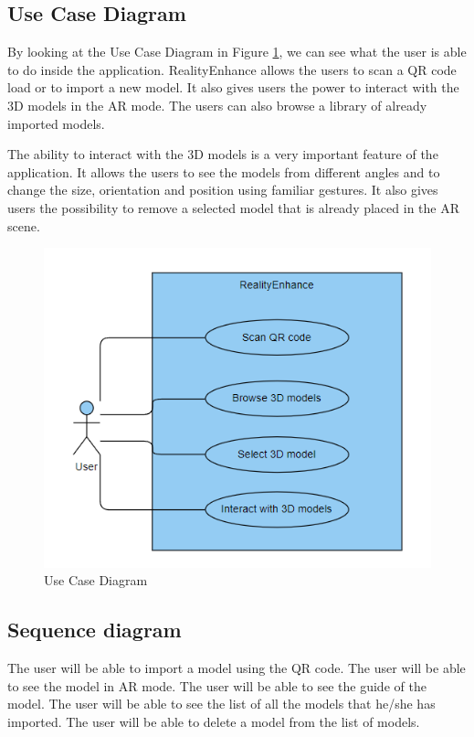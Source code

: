 \subsection*{Use Case Diagram}
By looking at the Use Case Diagram in Figure \ref{fig:UseCaseDiagram}, we can see what the user is able to do inside the application. RealityEnhance allows the users to scan a \ac{QR} code load or to import a new model. It also gives users the power to interact with the \ac{3D} models in the \ac{AR} mode. The users can also browse a library of already imported models.

The ability to interact with the \ac{3D} models is a very important feature of the application. It allows the users to see the models from different angles and to change the size, orientation and position using familiar gestures. It also gives users the possibility to remove a selected model that is already placed in the \ac{AR} scene.
\begin{figure}[ht]
    \centering
    \includegraphics{img/UseCaseDiagram.png}
    \caption{Use Case Diagram}
    \label{fig:UseCaseDiagram}
\end{figure}

\clearpage

\subsection*{Sequence diagram}
The user will be able to import a model using the \ac{QR} code. The user will be able to see the model in \ac{AR} mode. The user will be able to see the guide of the model. The user will be able to see the list of all the models that he/she has imported. The user will be able to delete a model from the list of models.

